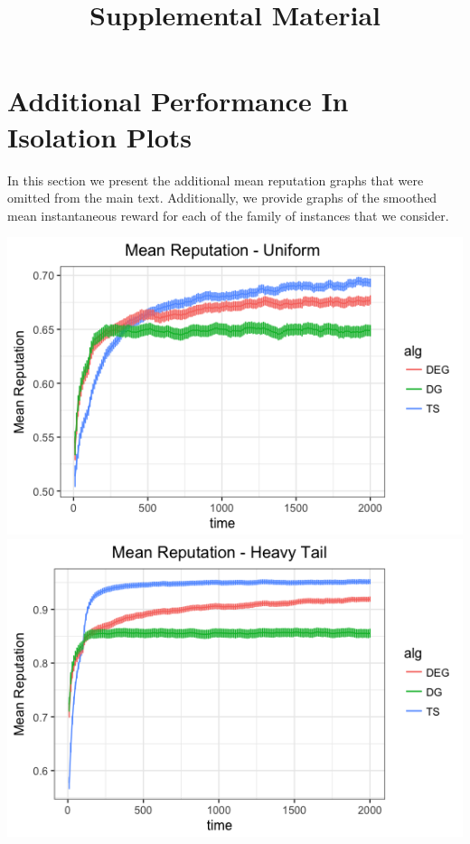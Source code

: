 \documentclass[11pt,letterpaper]{article}
\theoremstyle{definition}
\begin{document}
 

\title{Supplemental Material}
\date{}
\maketitle

\appendix
\section{Additional Performance In Isolation Plots}

In this section we present the additional mean reputation graphs that were omitted from the main text. Additionally, we provide graphs of the smoothed mean instantaneous reward for each of the family of instances that we consider.

\begin{center}
\includegraphics[scale=0.35]{figures/uniform_mean} \\
\includegraphics[scale=0.35]{figures/ht_mean} \\

\end{center}
\end{document}
